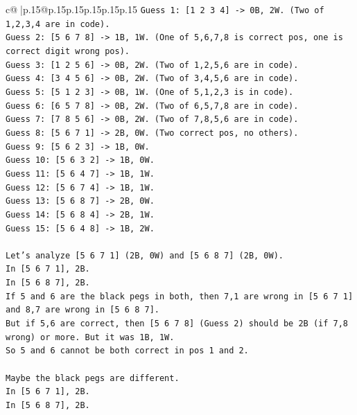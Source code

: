 \documentclass{article}
\begin{document}
{\begin{supertabular}{c@{$\;$}|p{.15\linewidth}@{}p{.15\linewidth}p{.15\linewidth}p{.15\linewidth}p{.15\linewidth}p{.15\linewidth}}
{{{\texttt{Guess 1: {[}1 2 3 4{]} {-}> 0B, 2W. (Two of 1,2,3,4 are in code).} \\
\texttt{Guess 2: {[}5 6 7 8{]} {-}> 1B, 1W. (One of 5,6,7,8 is correct pos, one is correct digit wrong pos).} \\
\texttt{Guess 3: {[}1 2 5 6{]} {-}> 0B, 2W. (Two of 1,2,5,6 are in code).} \\
\texttt{Guess 4: {[}3 4 5 6{]} {-}> 0B, 2W. (Two of 3,4,5,6 are in code).} \\
\texttt{Guess 5: {[}5 1 2 3{]} {-}> 0B, 1W. (One of 5,1,2,3 is in code).} \\
\texttt{Guess 6: {[}6 5 7 8{]} {-}> 0B, 2W. (Two of 6,5,7,8 are in code).} \\
\texttt{Guess 7: {[}7 8 5 6{]} {-}> 0B, 2W. (Two of 7,8,5,6 are in code).} \\
\texttt{Guess 8: {[}5 6 7 1{]} {-}> 2B, 0W. (Two correct pos, no others).} \\
\texttt{Guess 9: {[}5 6 2 3{]} {-}> 1B, 0W.} \\
\texttt{Guess 10: {[}5 6 3 2{]} {-}> 1B, 0W.} \\
\texttt{Guess 11: {[}5 6 4 7{]} {-}> 1B, 1W.} \\
\texttt{Guess 12: {[}5 6 7 4{]} {-}> 1B, 1W.} \\
\texttt{Guess 13: {[}5 6 8 7{]} {-}> 2B, 0W.} \\
\texttt{Guess 14: {[}5 6 8 4{]} {-}> 2B, 1W.} \\
\texttt{Guess 15: {[}5 6 4 8{]} {-}> 1B, 2W.} \\
\\ 
\texttt{Let's analyze {[}5 6 7 1{]} (2B, 0W) and {[}5 6 8 7{]} (2B, 0W).} \\
\texttt{In {[}5 6 7 1{]}, 2B.} \\
\texttt{In {[}5 6 8 7{]}, 2B.} \\
\texttt{If 5 and 6 are the black pegs in both, then 7,1 are wrong in {[}5 6 7 1{]} and 8,7 are wrong in {[}5 6 8 7{]}.} \\
\texttt{But if 5,6 are correct, then {[}5 6 7 8{]} (Guess 2) should be 2B (if 7,8 wrong) or more. But it was 1B, 1W.} \\
\texttt{So 5 and 6 cannot be both correct in pos 1 and 2.} \\
\\ 
\texttt{Maybe the black pegs are different.} \\
\texttt{In {[}5 6 7 1{]}, 2B.} \\
\texttt{In {[}5 6 8 7{]}, 2B.} \\
}}}
\end{supertabular}}
\end{document}

